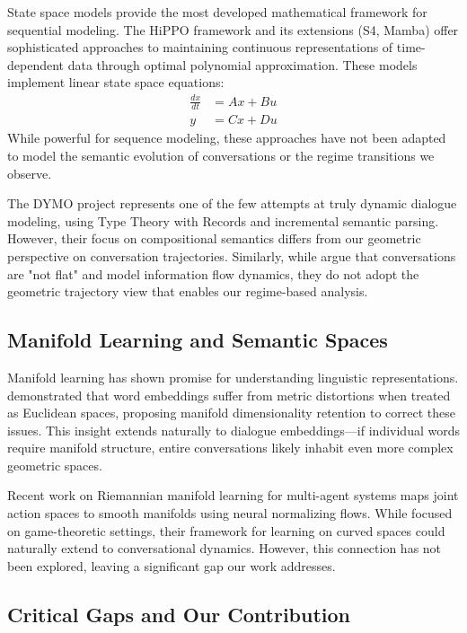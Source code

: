 \documentclass[11pt,letterpaper]{article}
\begin{document}
State space models provide the most developed mathematical framework for sequential modeling. The HiPPO framework \citep{gu2020hippo} and its extensions (S4, Mamba) offer sophisticated approaches to maintaining continuous representations of time-dependent data through optimal polynomial approximation. These models implement linear state space equations:
\begin{align}
\frac{dx}{dt} &= Ax + Bu \\
y &= Cx + Du
\end{align}
While powerful for sequence modeling, these approaches have not been adapted to model the semantic evolution of conversations or the regime transitions we observe.

The DYMO project \citep{eshghi2017dymo} represents one of the few attempts at truly dynamic dialogue modeling, using Type Theory with Records and incremental semantic parsing. However, their focus on compositional semantics differs from our geometric perspective on conversation trajectories. Similarly, while \citep{chen2021conversations} argue that conversations are "not flat" and model information flow dynamics, they do not adopt the geometric trajectory view that enables our regime-based analysis.

\subsection{Manifold Learning and Semantic Spaces}

Manifold learning has shown promise for understanding linguistic representations. \citep{hasan2017manifold} demonstrated that word embeddings suffer from metric distortions when treated as Euclidean spaces, proposing manifold dimensionality retention to correct these issues. This insight extends naturally to dialogue embeddings—if individual words require manifold structure, entire conversations likely inhabit even more complex geometric spaces.

Recent work on Riemannian manifold learning for multi-agent systems \citep{liu2025riemannian} maps joint action spaces to smooth manifolds using neural normalizing flows. While focused on game-theoretic settings, their framework for learning on curved spaces could naturally extend to conversational dynamics. However, this connection has not been explored, leaving a significant gap our work addresses.

\subsection{Critical Gaps and Our Contribution}
\end{document}
